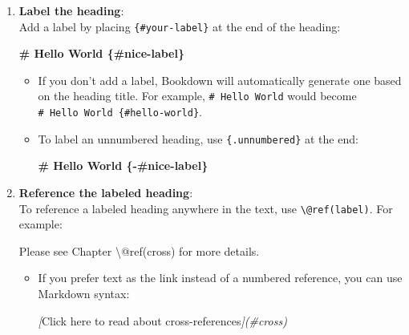 \documentclass[
]{book}
\newenvironment{Shaded}{\begin{snugshade}}{\end{snugshade}}
\newcommand{\CommentTok}[1]{\textcolor[rgb]{0.56,0.35,0.01}{\textit{#1}}}
\newcommand{\FunctionTok}[1]{\textcolor[rgb]{0.13,0.29,0.53}{\textbf{#1}}}
\newcommand{\NormalTok}[1]{#1}
\newcommand{\OtherTok}[1]{\textcolor[rgb]{0.56,0.35,0.01}{#1}}
\theoremstyle{definition}
\theoremstyle{definition}
\theoremstyle{definition}
\theoremstyle{definition}
\theoremstyle{remark}
\begin{document}
\begin{enumerate}
\def\labelenumi{\arabic{enumi}.}
\item
  \textbf{Label the heading}:\\
  Add a label by placing \texttt{\{\#your-label\}} at the end of the heading:

\begin{Shaded}
\begin{Highlighting}[]
\FunctionTok{\# Hello World \{\#nice{-}label\}}
\end{Highlighting}
\end{Shaded}

  \begin{itemize}
  \item
    If you don't add a label, Bookdown will automatically generate one based on the heading title. For example, \texttt{\#\ Hello\ World} would become \texttt{\#\ Hello\ World\ \{\#hello-world\}}.
  \item
    To label an unnumbered heading, use \texttt{\{.unnumbered\}} at the end:

\begin{Shaded}
\begin{Highlighting}[]
\FunctionTok{\# Hello World \{{-}\#nice{-}label\}}
\end{Highlighting}
\end{Shaded}
  \end{itemize}
\item
  \textbf{Reference the labeled heading}:\\
  To reference a labeled heading anywhere in the text, use \texttt{\textbackslash{}@ref(label)}. For example:

\begin{Shaded}
\begin{Highlighting}[]
\NormalTok{Please see Chapter \textbackslash{}@ref(cross) for more details.}
\end{Highlighting}
\end{Shaded}

  \begin{itemize}
  \item
    If you prefer text as the link instead of a numbered reference, you can use Markdown syntax:

\begin{Shaded}
\begin{Highlighting}[]
\CommentTok{[}\OtherTok{Click here to read about cross{-}references}\CommentTok{](\#cross)}
\end{Highlighting}
\end{Shaded}
  \end{itemize}
\end{enumerate}
\end{document}
